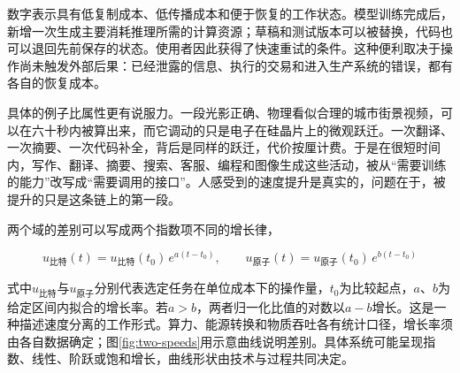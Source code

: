数字表示具有低复制成本、低传播成本和便于恢复的工作状态。模型训练完成后，新增一次生成主要消耗推理所需的计算资源；草稿和测试版本可以被替换，代码也可以退回先前保存的状态。使用者因此获得了快速重试的条件。这种便利取决于操作尚未触发外部后果：已经泄露的信息、执行的交易和进入生产系统的错误，都有各自的恢复成本。

具体的例子比属性更有说服力。一段光影正确、物理看似合理的城市街景视频，可以在六十秒内被算出来，而它调动的只是电子在硅晶片上的微观跃迁。一次翻译、一次摘要、一次代码补全，背后是同样的跃迁，代价按厘计费。于是在很短时间内，写作、翻译、摘要、搜索、客服、编程和图像生成这些活动，被从“需要训练的能力”改写成“需要调用的接口”。人感受到的速度提升是真实的，问题在于，被提升的只是这条链上的第一段。

两个域的差别可以写成两个指数项不同的增长律，

\begin{equation}
u_{\text{比特}}(t)=u_{\text{比特}}(t_{0})\,e^{a(t-t_{0})},
\qquad
u_{\text{原子}}(t)=u_{\text{原子}}(t_{0})\,e^{b(t-t_{0})}
\end{equation}

式中$u_{\text{比特}}$与$u_{\text{原子}}$分别代表选定任务在单位成本下的操作量，$t_0$为比较起点，$a$、$b$为给定区间内拟合的增长率。若$a>b$，两者归一化比值的对数以$a-b$增长。这是一种描述速度分离的工作形式。算力、能源转换和物质吞吐各有统计口径，增长率须由各自数据确定；图\ref{fig:two-speeds}用示意曲线说明差别。具体系统可能呈现指数、线性、阶跃或饱和增长，曲线形状由技术与过程共同决定。

